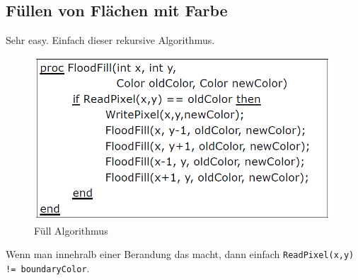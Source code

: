 \subsection{Füllen von Flächen mit Farbe}
Sehr easy. Einfach dieser rekursive Algorithmus.
\begin{figure}[!ht]
	\centering
	\includegraphics[width=0.4\linewidth]{fig/flaeche_fill}
	\caption{Füll Algorithmus}
	\label{flaeche_fill}
\end{figure}
Wenn man innehralb einer Berandung das macht, dann einfach \texttt{ReadPixel(x,y) != boundaryColor}.

